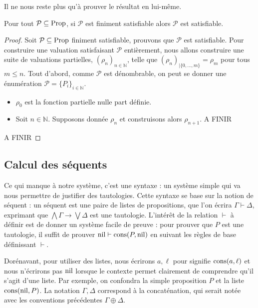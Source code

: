 Il ne nous reste plus qu'à prouver le résultat en lui-même.

\begin{theorem}
  Pour tout $\mathcal P\subseteq\operatorname{Prop}$, si $\mathcal P$ est finiment satisfiable
  alors $\mathcal P$ est satisfiable.
\end{theorem}

\begin{proof}
  Soit $\mathcal P\subseteq\operatorname{Prop}$ finiment satisfiable, prouvons que $\mathcal P$
  est satisfiable. Pour construire une valuation satisfaisant $\mathcal P$
  entièrement, nous allons construire une suite de valuations partielles,
  $(\rho_n)_{n\in\mathbb N}$, telle que $(\rho_n)_{|\{0,\ldots,m\}}=\rho_m$ pour tous
  $m\leq n$. Tout d'abord, comme $\mathcal P$ est dénombrable, on peut se donner
  une énumération $\mathcal P = \{P_i\}_{i\in\mathbb N}$.
  \begin{itemize}
  \item $\rho_0$ est la fonction partielle nulle part définie.
  \item Soit $n\in\mathbb N$. Supposons donnée $\rho_n$ et construisons alors
    $\rho_{n+1}$. A FINIR
  \end{itemize}

  A FINIR
\end{proof}

\subsection{Calcul des séquents}

Ce qui manque à notre système, c'est une syntaxe : un système simple qui va nous
permettre de justifier des tautologies. Cette syntaxe se base sur la notion de
séquent : un séquent est une paire de listes de propositions, que l'on écrira
$\Gamma\vdash \Delta$, exprimant que $\bigwedge \Gamma \to \bigvee \Delta$ est
une tautologie. L'intérêt de la relation $\vdash$ à définir est de donner un
système facile de preuve : pour prouver que $P$ est une tautologie, il suffit
de prouver $\operatorname{nil}\vdash \operatorname{cons}(P,\operatorname{nil})$ en suivant les règles de base définissant
$\vdash$.

\begin{notation}
  Dorénavant, pour utiliser des listes, nous écrirons $a, \ell$ pour signifie
  $\operatorname{cons}(a,\ell)$ et nous n'écrirons pas $\operatorname{nil}$ lorsque le contexte permet
  clairement de comprendre qu'il s'agit d'une liste. Par exemple, on confondra
  la simple proposition $P$ et la liste $\operatorname{cons}(\operatorname{nil},P)$. La notation
  $\Gamma,\Delta$ correspond à la concaténation, qui serait notée avec les
  conventions précédentes $\Gamma\oplus\Delta$.
\end{notation}

